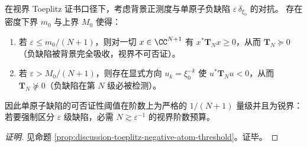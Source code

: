 \begin{conclusion}\label{con:xi-terminal-toeplitz-negative-atom-threshold-sharp}
在视界 Toeplitz 证书口径下，考虑背景正测度与单原子负缺陷 \(\varepsilon\,\delta_{\xi_0}\) 的对抗。
存在密度下界 \(m_0\) 与上界 \(M_0\) 使得：
\begin{enumerate}
  \item 若 \(\varepsilon\le m_0/(N+1)\)，则对一切 \(x\in\CC^{N+1}\) 有 \(x^\ast \mathbf{T}_N x\ge 0\)，从而 \(\mathbf{T}_N\succeq 0\)（负缺陷被背景完全吸收，视界不可否证）。
  \item 若 \(\varepsilon> M_0/(N+1)\)，则存在显式方向 \(u_k=\xi_0^{-k}\) 使 \(u^\ast\mathbf{T}_N u<0\)，从而 \(\mathbf{T}_N\not\succeq 0\)（负缺陷在第 \(N\) 级必被检测）。
\end{enumerate}
因此单原子缺陷的可否证性阈值在阶数上为严格的 \(1/(N+1)\) 量级并且为锐界：若要强制区分 \(\varepsilon\) 级缺陷，必需 \(N\gtrsim \varepsilon^{-1}\) 的视界阶数预算。
\end{conclusion}
\begin{proof}[证明]
见命题 \ref{prop:discussion-toeplitz-negative-atom-threshold}。证毕。
\end{proof}

